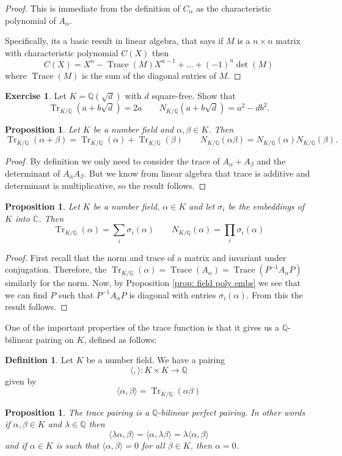 \documentclass[11pt,a4paper]{report}
\theoremstyle{plain}
\newtheorem{prop}[subsection]{Proposition}
\theoremstyle{definition}
\newtheorem{definition}[subsection]{Definition}
\theoremstyle{definition}
\newtheorem{question}[subsection]{Exercise}
\newcommand{\Tr}{\operatorname{Tr}}
\def\CC{\mathbb{C}}
\def\QQ{\mathbb{Q}}
\def \a{\alpha}
\def \lam {\lambda}
\DeclareMathOperator{\Trace}{Trace}
\begin{document}
	\begin{proof}
		This is immediate from the definition of $C_\a$ as the characteristic polynomial of $A_\a$.
		
		Specifically, its a basic result in linear algebra, that says if $M$ is a $n\times n$ matrix with characteristic polynomial $C(X)$ then \[C(X)=X^n-\Trace(M)X^{n-1}+\dots+(-1)^n\det(M)   \] where $\Trace(M)$ is the sum of the diagonal entries of $M$.
	\end{proof}
	
	\begin{question}
		Let $K=\QQ(\sqrt{d})$ with $d$ square-free. Show that \[\Tr_{K/\QQ}(a+b\sqrt{d})=2a \qquad N_{K/\QQ}(a+b\sqrt{d})=a^2-db^2.\] 
	\end{question}
	
	
	\begin{prop}
		Let $K$ be a number field and $\a,\beta \in K$. Then \[\Tr_{K/\QQ}(\a+\beta)=\Tr_{K/\QQ}(\a)+\Tr_{K/\QQ}(\beta) \qquad N_{K/\QQ}(\a \beta )=N_{K/\QQ}(\a)N_{K/\QQ}(\beta).\]
	\end{prop}
	
	\begin{proof}
		By definition we only need to consider the trace of $A_\a+A_\beta$ and the determinant of $A_\a A_\beta$. But we know from linear algebra that trace is additive and determinant is multiplicative, so the result follows.
	\end{proof}
	
	\begin{prop}\label{prop: alt definition of norm and trace}
		Let $K$ be a number field, $\a \in K$ and let $\sigma_i$ be the embeddings of $K$ into $\CC$. Then \[\Tr_{K/\QQ}(\a) =\sum_i \sigma_i(\a) \qquad N_{K/\QQ}(\a)=\prod_i \sigma_i(\a)  \]
	\end{prop}
	
	\begin{proof}
		First recall that the norm and trace of a matrix and invariant under conjugation. Therefore, the $\Tr_{K/\QQ}(\a)=\Trace(A_\a)=\Trace(P^{-1}A_\a P)$ similarly for the norm. Now, by Proposition \ref{prop: field poly embs} we see that we can find $P$ such that $P^{-1}A_\a P$ is diagonal with entries $\sigma_i(\a)$. From this the result follows. 
	\end{proof}
	
	One of the important properties of the trace function is that it gives us a $\QQ$-bilinear pairing on $K$, defined as follows:
	\begin{definition}
		Let $K$ be a number field. We have a pairing \[\langle , \rangle : K \times K \to \QQ\] given by \[\langle \a ,\beta \rangle= \Tr_{K/\QQ}(\a \beta)\]
	\end{definition}
	\begin{prop}\label{prop: tr perfect}
		The trace pairing is a $\QQ$-bilinear perfect pairing. In other words if $\a,\beta \in K$ and $\lam \in \QQ$ then \[\langle \lam \a ,\beta \rangle=\langle \a , \lam \beta \rangle=\lam \langle \a ,\beta \rangle\] and if $\a \in K$ is such that $\langle \a ,\beta \rangle =0$ for all $\beta \in K$, then $\a=0$.
	\end{prop}
	
\end{document}
